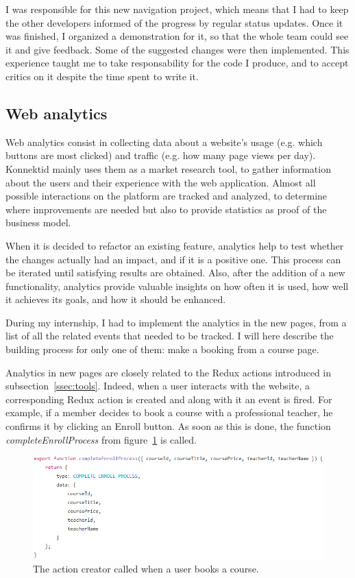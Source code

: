 I was responsible for this new navigation project, which means that I had to keep the other developers informed of the progress by regular status updates. Once it was finished, I organized a demonstration for it, so that the whole team could see it and give feedback. Some of the suggested changes were then implemented. This experience taught me to take responsability for the code I produce, and to accept critics on it despite the time spent to write it.

\subsection{Web analytics}
\label{ssec:analytics}

Web analytics consist in collecting data about a website's usage (e.g. which buttons are most clicked) and traffic (e.g. how many page views per day). Konnektid mainly uses them as a market research tool, to gather information about the users and their experience with the web application. Almost all possible interactions on the platform are tracked and analyzed, to determine where improvements are needed but also to provide statistics as proof of the business model.

When it is decided to refactor an existing feature, analytics help to test whether the changes actually had an impact, and if it is a positive one. This process can be iterated until satisfying results are obtained. Also, after the addition of a new functionality, analytics provide valuable insights on how often it is used, how well it achieves its goals, and how it should be enhanced. 

During my internship, I had to implement the analytics in the new pages, from a list of all the related events that needed to be tracked. I will here describe the building process for only one of them: make a booking from a course page.

Analytics in new pages are closely related to the Redux actions introduced in {\sc subsection}~\ref{ssec:tools}. Indeed, when a user interacts with the website, a corresponding Redux action is created and along with it an event is fired. For example, if a member decides to book a course with a professional teacher, he confirms it by clicking an \guillemotleft{} Enroll \guillemotright{} button. As soon as this is done, the function \textit{completeEnrollProcess} from {\sc figure}~\ref{fig:enroll} is called.

\begin{figure}[H]
    \centering
    \includegraphics{figure/enroll.png}
    \caption{The action creator called when a user books a course.}
    \label{fig:enroll}
\end{figure}

